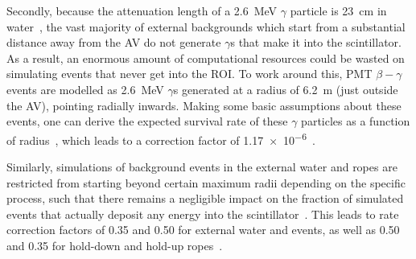Secondly, because the attenuation length of a \SI{2.6}{\MeV} $\gamma$ particle is \SI{23}{\cm} in water~\cite{}, %
the vast majority of external backgrounds which start from a substantial distance away from the AV do not generate $\gamma$s that make it into the scintillator. As a result, an enormous amount of computational resources could be wasted on simulating events that never get into the ROI. To work around this, PMT $\beta-\gamma$ events are modelled as \SI{2.6}{\MeV} $\gamma$s generated at a radius of \SI{6.2}{\m} (just outside the AV), pointing radially inwards. Making some basic assumptions about these events, one can derive the expected survival rate of these $\gamma$ particles as a function of radius~\cite{}, %
which leads to a correction factor of \num{1.17e-6}~\cite{}. %

Similarly, simulations of background events in the external water and ropes are restricted from starting beyond certain maximum radii depending on the specific process, such that there remains a negligible impact on the fraction of simulated events that actually deposit any energy into the scintillator~\cite{}. %
This leads to rate correction factors of 0.35 and 0.50 for external water  and  events, as well as 0.50 and 0.35 for hold-down and hold-up ropes~\cite{}. %


